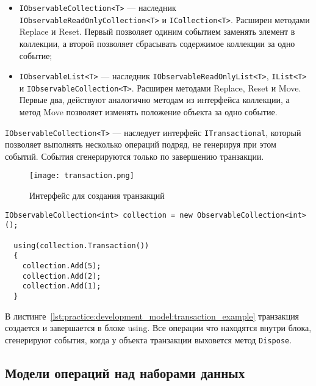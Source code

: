 \begin{itemize}
  \item \lstinline[style=csharpinlinestyle]!IObservableCollection<T>! --- наследник \lstinline[style=csharpinlinestyle]!IObservableReadOnlyCollection<T>! и \lstinline[style=csharpinlinestyle]!ICollection<T>!.
  Расширен методами Replace и Reset. Первый позволяет одиним событием заменять элемент в коллекции, а второй позволяет сбрасывать содержимое коллекции за одно событие;
  \item \lstinline[style=csharpinlinestyle]!IObservableList<T>! --- наследник \lstinline[style=csharpinlinestyle]!IObservableReadOnlyList<T>!, \lstinline[style=csharpinlinestyle]!IList<T>! и \lstinline[style=csharpinlinestyle]!IObservableCollection<T>!.
  Расширен методами Replace, Reset и Move. Первые два, действуют аналогично методам из интерфейса коллекции, а метод Move позволяет изменять положение объекта за одно событие.
\end{itemize}

\lstinline[style=csharpinlinestyle]!IObservableCollection<T>! --- наследует интерфейс \lstinline[style=csharpinlinestyle]!ITransactional!, который позволяет выполнять несколько операций подряд, не генерируя при этом событий.
События сгенерируются только по завершению транзакции.

\begin{figure}[ht]
\centering
  \texttt{[image: transaction.png]}
  \caption{ Интерфейс для создания транзакций }
  \label{fig:transaction}
\end{figure}

\begin{lstlisting}[style=csharpinlinestyle, caption={Использование транзакции}, label=lst:practice:development_model:transaction_example]
  IObservableCollection<int> collection = new ObservableCollection<int>();

  using(collection.Transaction())
  {
    collection.Add(5);
    collection.Add(2);
    collection.Add(1);
  }
\end{lstlisting}

В листинге~\ref{lst:practice:development_model:transaction_example} транзакция создается и завершается в блоке using.
Все операции что находятся внутри блока, сгенерируют события, когда у объекта транзакции выховется метод \lstinline[style=csharpinlinestyle]!Dispose!.

\subsection{Модели операций над наборами данных}
\label{sub:research:operational_model}

